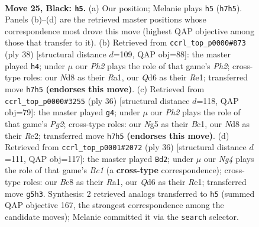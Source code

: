 \documentclass[11pt]{article}
\begin{document}
\clearpage

\begin{figure}[p]\centering
\begin{subfigure}{0.46\textwidth}\centering
\resizebox{\linewidth}{!}{%
\newchessgame
\chessboard[
  setfen={r1bn1k2/1ppp1ppp/p2q4/B2Pr1n1/Q6N/4P1P1/PP2RPBP/1R4K1 b - - 26 25},
  showmover=false,
  pgfstyle=straightmove, color=movearrow, markmove={h7-h5}
]}
\caption{}
\end{subfigure}\hfill
\begin{subfigure}{0.46\textwidth}\centering
\resizebox{\linewidth}{!}{%
\newchessgame
\chessboard[
  setfen={2r1rbk1/1p1n1ppb/1qp1p2p/p7/P1QPP3/1P1N2P1/1B3PBP/R3R1K1 w - - 3 20},
  showmover=false,
  pgfstyle=straightmove, color=movearrow, markmove={h2-h4}
]}
\caption{}
\end{subfigure}
\\[4pt]
\begin{subfigure}{0.46\textwidth}\centering
\resizebox{\linewidth}{!}{%
\newchessgame
\chessboard[
  setfen={r1bq3k/pp1n1rp1/4p2p/2bpPp2/8/P2B1N1Q/1P2RPPP/R1B3K1 w - - 4 19},
  showmover=false,
  pgfstyle=straightmove, color=movearrow, markmove={g2-g4}
]}
\caption{}
\end{subfigure}\hfill
\begin{subfigure}{0.46\textwidth}\centering
\resizebox{\linewidth}{!}{%
\newchessgame
\chessboard[
  setfen={3rrbk1/p1q3pp/2p2p2/P1pnp3/2N5/2PP2Q1/1P3PPP/R1B1R1K1 w - - 1 19},
  showmover=false,
  pgfstyle=straightmove, color=movearrow, markmove={c1-d2}
]}
\caption{}
\end{subfigure}
\caption{\textbf{Move 25, Black: \texttt{h5}.} (a) Our position; Melanie plays \texttt{h5} (\texttt{h7h5}). Panels (b)--(d) are the retrieved master positions whose correspondence most drove this move (highest QAP objective among those that transfer to it). (b) Retrieved from \texttt{ccrl\_top\_p0000\#873} (ply 38) [structural distance $d$=109, QAP obj=88]: the master played \texttt{h4}; under $\mu$ our \emph{Ph2} plays the role of that game's \emph{Ph2}; cross-type roles: our \emph{N}d8 as their \emph{R}a1, our \emph{Q}d6 as their \emph{R}e1; transferred move \texttt{h7h5} \textbf{(endorses this move)}. (c) Retrieved from \texttt{ccrl\_top\_p0000\#3255} (ply 36) [structural distance $d$=118, QAP obj=79]: the master played \texttt{g4}; under $\mu$ our \emph{Ph2} plays the role of that game's \emph{Pg2}; cross-type roles: our \emph{N}g5 as their \emph{B}c1, our \emph{N}d8 as their \emph{R}e2; transferred move \texttt{h7h5} \textbf{(endorses this move)}. (d) Retrieved from \texttt{ccrl\_top\_p0001\#2072} (ply 36) [structural distance $d$=111, QAP obj=117]: the master played \texttt{Bd2}; under $\mu$ our \emph{Ng4} plays the role of that game's \emph{Bc1} (a \textbf{cross-type} correspondence); cross-type roles: our \emph{B}c8 as their \emph{R}a1, our \emph{Q}d6 as their \emph{R}e1; transferred move \texttt{g5h3}. Synthesis: 2 retrieved analogs transferred to \texttt{h5} (summed QAP objective 167, the strongest correspondence among the candidate moves); Melanie committed it via the \texttt{search} selector.}
\label{fig:thought-m49}
\end{figure}
\end{document}
